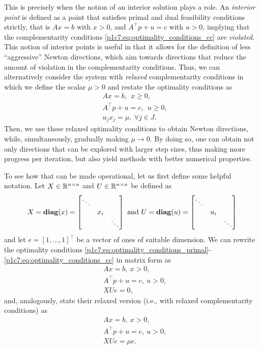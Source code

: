 	
This is precisely when the notion of an interior solution plays a role. An \emph{interior point} is defined as a point that satisfies primal and dual feasibility conditions strictly, that is $Ax = b$ with $x > 0$, and $A^\top p + u = c$ with $u >0$, implying that the complementarity conditions \eqref{p1c7:eq:optimality_conditions_cc} are \emph{violated}. This notion of interior points is useful in that it allows for the definition of less ``aggressive'' Newton directions, which aim towards directions that reduce the amount of violation in the complementarity conditions. Thus, we can alternatively consider the system with \emph{relaxed} complementarity conditions in which we define the scalar $\mu > 0$ and restate the optimality conditions as 	
	\begin{align*}
		& Ax = b, \ \ x \geq 0,\\ 
		& A^\top p + u = c, \ \ u \geq 0, \\
		& u_j x_j = \mu, \ \forall j \in J. 
	\end{align*}
	Then, we use these relaxed optimality conditions to obtain Newton directions, while, simultaneously, gradually making $\mu \to 0$. By doing so, one can obtain not only directions that can be explored with larger step sizes, thus making more progress per iteration, but also yield methods with better numerical properties.
	
To see how that can be made operational, let us first define some helpful notation. Let $X\in \mathbb{R}^{n\times n}$ and $U \in \mathbb{R}^{n \times n}$ be defined as
	$$
	X = \mathop{\bf diag}(x) = \begin{bmatrix} \ddots & & \\   
	                                        & x_i & \\
	                                        & & \ddots     
	                 \end{bmatrix}
	                 \text{ and }
	U = \mathop{\bf diag}(u) = \begin{bmatrix} \ddots & & \\   
	                                        & u_i & \\
	                                        & & \ddots     
	                 \end{bmatrix}               
	$$
	and let $e = [1,\dots,1]^\top$ be a vector of ones of suitable dimension. We can rewrite the optimality conditions \eqref{p1c7:eq:optimality_conditions_primal}- \eqref{p1c7:eq:optimality_conditions_cc} in matrix form as 
	\begin{align*}
		&Ax = b, \ x > 0, \\ 
		&A^\top p + u = c, \ u > 0,\\ 
		&XUe = 0, 
	\end{align*}
 	and, analogously, state their relaxed version (i.e., with relaxed complementarity conditions) as
 	\begin{align}
		&Ax = b, \ x > 0, \label{p1c7:eq:optimality_conditions_matrix_primal}\\ 
		&A^\top p + u = c, \ u > 0, \label{p1c7:eq:optimality_conditions_matrix_dual}\\ 
		&XUe = \mu e. \label{p1c7:eq:optimality_conditions_matrix_relaxed_cc}
	\end{align}

